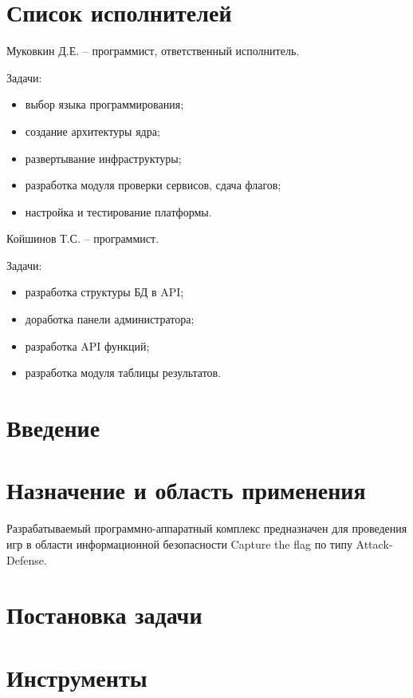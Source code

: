 


 
 
 
 \newpage
 \section*{Список исполнителей}

Муковкин Д.Е. -- программист, ответственный исполнитель.

Задачи:
\begin{itemize}
\item выбор языка программирования;
\item создание архитектуры ядра;
\item развертывание инфраструктуры;
\item разработка модуля проверки сервисов, сдача флагов;
\item настройка и тестирование платформы.
\end{itemize}

Койшинов Т.С. -- программист.

Задачи:
\begin{itemize}
\item разработка структуры БД в API;
\item доработка панели администратора;
\item разработка API функций;
\item разработка модуля таблицы результатов.
\end{itemize}
 
 \newpage
 \tableofcontents

 \newpage
 \section*{Введение}
 
 \newpage
 \section{Назначение и область применения}
Разрабатываемый программно-аппаратный комплекс предназначен для проведения игр в области информационной безопасности Capture the flag по типу Attack-Defense.
\section{Постановка задачи}
\setcounter{figure}{0}

\section{Инструменты}
\setcounter{figure}{0}
